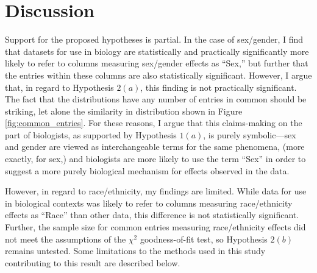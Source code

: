 \section{Discussion}\label{sec:disc}

\hspace{13pt}  Support for the proposed hypotheses is partial. In the case of sex/gender, I find that datasets for use in biology are statistically and practically significantly more likely to refer to columns measuring sex/gender effects as ``Sex,'' but further that the entries within these columns are also statistically significant. However, I argue that, in regard to Hypothesis $2(a)$, this finding is not practically significant. The fact that the distributions have any number of entries in common should be striking, let alone the similarity in distribution shown in Figure \ref{fig:common_entries}. For these reasons, I argue that this claims-making on the part of biologists, as supported by Hypothesis $1(a)$, is purely symbolic---sex and gender are viewed as interchangeable terms for the same phenomena, (more exactly, for sex,) and biologists are more likely to use the term ``Sex'' in order to suggest a more purely biological mechanism for effects observed in the data.

However, in regard to race/ethnicity, my findings are limited. While data for use in biological contexts was likely to refer to columns measuring race/ethnicity effects as ``Race'' than other data, this difference is not statistically significant. Further, the sample size for common entries measuring race/ethnicity effects did not meet the assumptions of the $\chi^2$ goodness-of-fit test, so Hypothesis $2(b)$ remains untested. Some limitations to the methods used in this study contributing to this result are described below.


